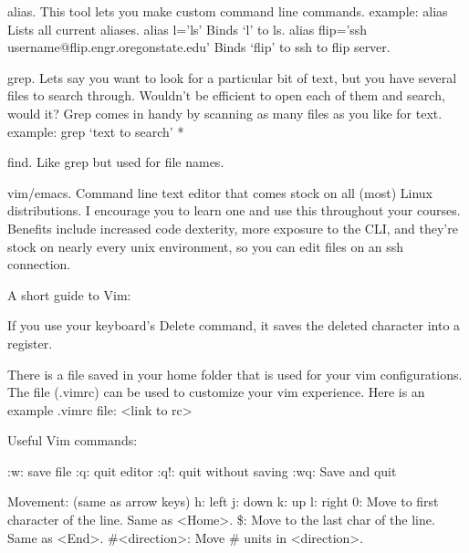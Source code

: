 \documentclass[letterpaper,10pt,titlepage,fleqn]{article}
\begin{document}
alias. This tool lets you make custom command line commands. 
example:
alias                                Lists all current aliases. 
alias l=’ls’                            Binds ‘l’ to ls.
alias flip=’ssh username@flip.engr.oregonstate.edu’        Binds ‘flip’ to ssh to flip server.

grep. Lets say you want to look for a particular bit of text, but you have several files to search through. Wouldn’t be efficient to open each of them and search, would it? Grep comes in handy by scanning as many files as you like for text.
example:
grep ‘text to search’ *

find. Like grep but used for file names.

vim/emacs.  Command line text editor that comes stock on all (most) Linux distributions. I encourage you to learn one and use this throughout your courses. Benefits include increased code dexterity, more exposure to the CLI, and they’re stock on nearly every unix environment, so you can edit files on an ssh connection. 

A short guide to Vim:

If you use your keyboard’s Delete command, it saves the deleted character into a register.

There is a file saved in your home folder that is used for your vim configurations. The file (.vimrc) can be used to customize your vim experience. Here is an example .vimrc file: <link to rc>

Useful Vim commands: 

:w: save file
:q: quit editor
:q!: quit without saving
:wq: Save and quit

Movement:
(same as arrow keys)
h: left
j: down
k: up
l: right
0: Move to first character of the line. Same as <Home>.
\$: Move to the last char of the line. Same as <End>.
\#<direction>: Move \# units in <direction>.
\end{document}
